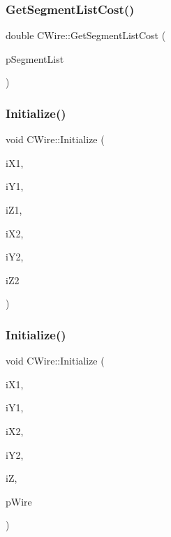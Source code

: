 \mbox{\label{classCWire_a1ae9fcc1cce6786baafc20dd4adb27c0}} 
\subsubsection{\texorpdfstring{GetSegmentListCost()}{GetSegmentListCost()}}
{\footnotesize\ttfamily double C\+Wire\+::\+Get\+Segment\+List\+Cost (\begin{DoxyParamCaption}\item[{vector$<$ \mbox{\hyperlink{classCSegment}{C\+Segment}} $\ast$ $>$ $\ast$}]{p\+Segment\+List }\end{DoxyParamCaption})\hspace{0.3cm}{\ttfamily [static]}}

\mbox{\label{classCWire_a32e6d904a2f532d7b6d489d8ffe4884f}} 
\subsubsection{\texorpdfstring{Initialize()}{Initialize()}\hspace{0.1cm}{\footnotesize\ttfamily [1/3]}}
{\footnotesize\ttfamily void C\+Wire\+::\+Initialize (\begin{DoxyParamCaption}\item[{int}]{i\+X1,  }\item[{int}]{i\+Y1,  }\item[{int}]{i\+Z1,  }\item[{int}]{i\+X2,  }\item[{int}]{i\+Y2,  }\item[{int}]{i\+Z2 }\end{DoxyParamCaption})}

\mbox{\label{classCWire_abda250d5147d4fcf3721d4d89d238606}} 
\subsubsection{\texorpdfstring{Initialize()}{Initialize()}\hspace{0.1cm}{\footnotesize\ttfamily [2/3]}}
{\footnotesize\ttfamily void C\+Wire\+::\+Initialize (\begin{DoxyParamCaption}\item[{int}]{i\+X1,  }\item[{int}]{i\+Y1,  }\item[{int}]{i\+X2,  }\item[{int}]{i\+Y2,  }\item[{int}]{iZ,  }\item[{\mbox{\hyperlink{classCWire}{C\+Wire}} $\ast$}]{p\+Wire }\end{DoxyParamCaption})\hspace{0.3cm}{\ttfamily [virtual]}}

